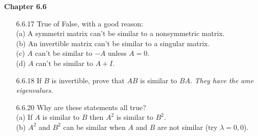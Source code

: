 \documentclass[10pt,twoside,reqno]{article}
\begin{document}
\begin{enumerate}
\vspace{3mm}
\end{enumerate}
\vspace{5mm}
\textbf{Chapter 6.6}
\begin{enumerate}
\item[6.6.17] True of False, with a good reason:\\
(a) A symmetri  matrix can't be similar to a nonsymmetric matrix.\\


\vspace{3mm}
(b) An invertible matrix can't be similar to a singular matrix.\\


\vspace{3mm}
(c) $A$ can't be similar to $-A$ unless $A = 0$.\\


\vspace{3mm}
(d) $A$ can't be similar to $A + I$.\\


\vspace{3mm}
\item[6.6.18] If $B$ is invertible, prove that $AB$ is similar to $BA$. \textit{They have the ame eigenvalues}.\\


\vspace{3mm}
\item[6.6.20] Why are these statements all true?\\
(a) If $A$ is similar to $B$ then $A^2$ is similar to $B^2$.\\


\vspace{3mm}
(b) $A^2$ and $B^2$ can be similar when $A$ and $B$ are not similar (try $\lambda = 0, 0$).\\



\end{enumerate}
\end{document}
